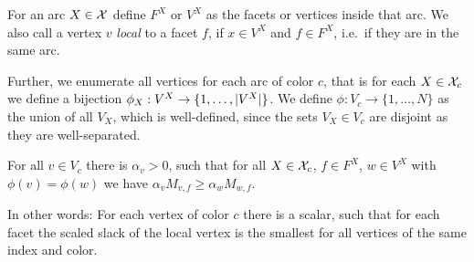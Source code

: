 For an arc $X \in \mathcal{X}$ define $F^X$ or $V^X$ as the facets or vertices inside that arc. We also call a vertex $v$ \emph{local} to a facet $f$, if $x \in V^X$ and $f \in F^X$, i.e.\ if they are in the same arc.

Further, we enumerate all vertices for each arc of color $c$, that is for each $X \in \mathcal{X}_c$ we define a bijection $\phi_X: V^X \to \{1,\dots,\lvert V^X\rvert\}$. We define $\phi: V_c \to \{1,\dots,N\}$ as the union of all $V_X$, which is well-defined, since the sets $V_X \in V_c$ are disjoint as they are well-separated.

\begin{lemma}\label{lemma:alphas}
  For all $v \in V_c$ there is $\alpha_v > 0$, such that for all $X \in \mathcal{X}_c$, $f \in F^X$, $w \in V^X$ with $\phi(v)=\phi(w)$ we have $\alpha_v M_{v,f} \geq \alpha_w M_{w,f}$.
\end{lemma}

In other words: For each vertex of color $c$ there is a scalar, such that for each facet the scaled slack of the local vertex is the smallest for all vertices of the same index and color.

